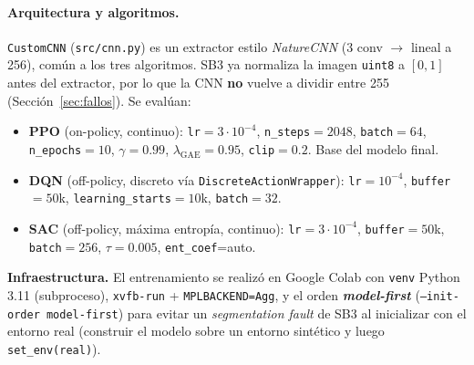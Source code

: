 \documentclass[11pt,a4paper]{article}
\newcommand{\code}[1]{\texttt{#1}}
\begin{document}
\paragraph{Arquitectura y algoritmos.} \code{CustomCNN} (\code{src/cnn.py}) es un extractor
estilo \emph{NatureCNN} (3 conv $\rightarrow$ lineal a 256), común a los tres algoritmos.
SB3 ya normaliza la imagen \code{uint8} a $[0,1]$ antes del extractor, por lo que la CNN
\textbf{no} vuelve a dividir entre 255 (Sección~\ref{sec:fallos}). Se evalúan:
\begin{itemize}
  \item \textbf{PPO} (on-policy, continuo): \code{lr}$=3\cdot10^{-4}$, \code{n\_steps}$=2048$,
  \code{batch}$=64$, \code{n\_epochs}$=10$, $\gamma=0.99$, $\lambda_{\text{GAE}}=0.95$,
  \code{clip}$=0.2$. Base del modelo final.
  \item \textbf{DQN} (off-policy, discreto vía \code{DiscreteActionWrapper}):
  \code{lr}$=10^{-4}$, \code{buffer}$=50$k, \code{learning\_starts}$=10$k, \code{batch}$=32$.
  \item \textbf{SAC} (off-policy, máxima entropía, continuo): \code{lr}$=3\cdot10^{-4}$,
  \code{buffer}$=50$k, \code{batch}$=256$, $\tau=0.005$, \code{ent\_coef}=auto.
\end{itemize}
\textbf{Infraestructura.} El entrenamiento se realizó en Google Colab con \code{venv}
Python 3.11 (subproceso), \code{xvfb-run} + \code{MPLBACKEND=Agg}, y el orden
\textbf{\emph{model-first}} (\code{--init-order model-first}) para evitar un
\emph{segmentation fault} de SB3 al inicializar con el entorno real (construir el modelo
sobre un entorno sintético y luego \code{set\_env(real)}).
\end{document}
